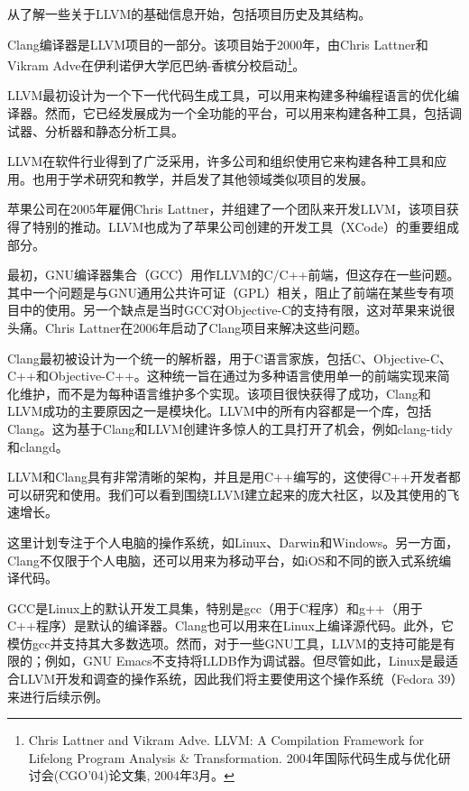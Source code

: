 从了解一些关于LLVM的基础信息开始，包括项目历史及其结构。


Clang编译器是LLVM项目的一部分。该项目始于2000年，由Chris Lattner和Vikram Adve在伊利诺伊大学厄巴纳-香槟分校启动\footnote{Chris Lattner and Vikram Adve. LLVM: A Compilation Framework for Lifelong Program Analysis \& Transformation. 2004年国际代码生成与优化研讨会(CGO'04)论文集, 2004年3月。}。

LLVM最初设计为一个下一代代码生成工具，可以用来构建多种编程语言的优化编译器。然而，它已经发展成为一个全功能的平台，可以用来构建各种工具，包括调试器、分析器和静态分析工具。

LLVM在软件行业得到了广泛采用，许多公司和组织使用它来构建各种工具和应用。也用于学术研究和教学，并启发了其他领域类似项目的发展。

苹果公司在2005年雇佣Chris Lattner，并组建了一个团队来开发LLVM，该项目获得了特别的推动。LLVM也成为了苹果公司创建的开发工具（XCode）的重要组成部分。

最初，GNU编译器集合（GCC）用作LLVM的C/C++前端，但这存在一些问题。其中一个问题是与GNU通用公共许可证（GPL）相关，阻止了前端在某些专有项目中的使用。另一个缺点是当时GCC对Objective-C的支持有限，这对苹果来说很头痛。Chris Lattner在2006年启动了Clang项目来解决这些问题。

Clang最初被设计为一个统一的解析器，用于C语言家族，包括C、Objective-C、C++和Objective-C++。这种统一旨在通过为多种语言使用单一的前端实现来简化维护，而不是为每种语言维护多个实现。该项目很快获得了成功，Clang和LLVM成功的主要原因之一是模块化。LLVM中的所有内容都是一个库，包括Clang。这为基于Clang和LLVM创建许多惊人的工具打开了机会，例如clang-tidy和clangd。

LLVM和Clang具有非常清晰的架构，并且是用C++编写的，这使得C++开发者都可以研究和使用。我们可以看到围绕LLVM建立起来的庞大社区，以及其使用的飞速增长。


这里计划专注于个人电脑的操作系统，如Linux、Darwin和Windows。另一方面，Clang不仅限于个人电脑，还可以用来为移动平台，如iOS和不同的嵌入式系统编译代码。


GCC是Linux上的默认开发工具集，特别是gcc（用于C程序）和g++（用于C++程序）是默认的编译器。Clang也可以用来在Linux上编译源代码。此外，它模仿gcc并支持其大多数选项。然而，对于一些GNU工具，LLVM的支持可能是有限的；例如，GNU Emacs不支持将LLDB作为调试器。但尽管如此，Linux是最适合LLVM开发和调查的操作系统，因此我们将主要使用这个操作系统（Fedora 39）来进行后续示例。

